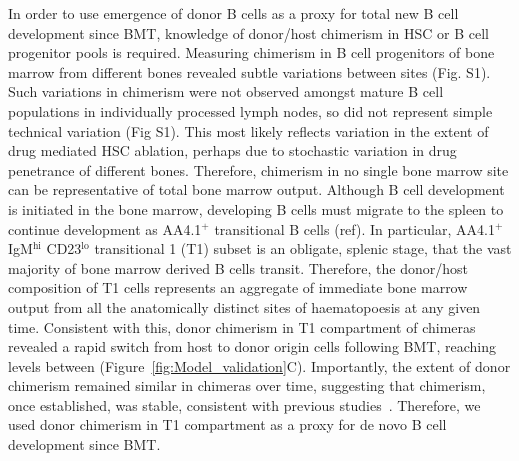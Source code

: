 \documentclass[11pt,onecolumn]{article}
\newcommand{\superscript}[1]{\ensuremath{^{\textrm{#1}}}} %
\newcommand{\red}[1]{{\color{red}{#1}}}
\begin{document}
In order to use emergence of donor B cells as a proxy for total new B cell development since BMT, 
knowledge of donor/host chimerism in HSC or B cell progenitor pools is required. Measuring chimerism in B cell progenitors of bone marrow from different bones revealed subtle variations between sites (Fig. S1). Such variations in chimerism were not observed amongst mature B cell populations in individually processed lymph nodes, so did not represent simple technical variation (Fig S1). This most likely reflects variation in the extent of drug mediated HSC ablation, perhaps due to stochastic variation in drug penetrance of different bones. Therefore, chimerism in no single bone marrow site can be representative of total bone marrow output. Although B cell development is initiated in the bone marrow,  developing B cells must migrate to the spleen to continue development as AA4.1\superscript{+} transitional B cells (ref). In particular, AA4.1\superscript{+} IgM\superscript{hi} CD23\superscript{lo} transitional 1 (T1) subset is an obligate, splenic stage, that the vast majority of bone marrow derived B cells  transit.  Therefore, the donor/host composition of T1 cells represents an aggregate of immediate bone marrow output from all the anatomically distinct sites of haematopoesis at any given time. Consistent with this,  donor chimerism in T1 compartment of chimeras revealed a rapid switch from host to donor origin cells following BMT, reaching levels between \red{X and Y\% }(Figure~\ref{fig:Model_validation}C). Importantly, the extent of donor chimerism remained similar in chimeras over time, suggesting that chimerism, once established, was stable, consistent with previous studies~\citep{Hogan:2015bd}. Therefore, we used donor chimerism in T1 compartment as a proxy for de novo B cell development since BMT.
\end{document}
